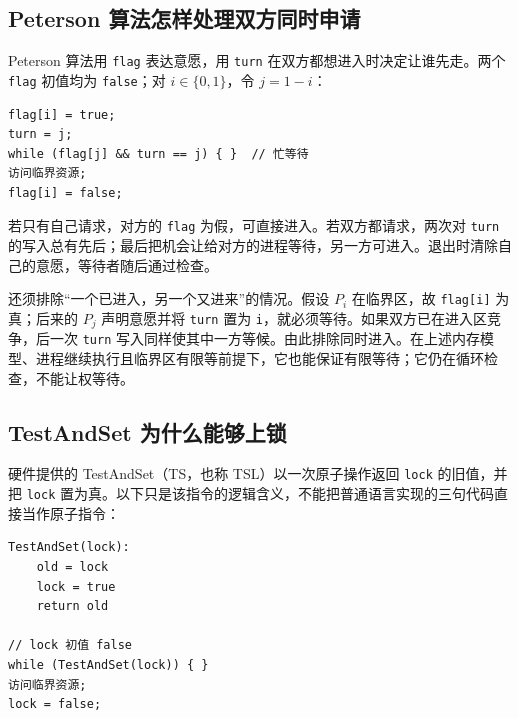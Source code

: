\subsection{Peterson 算法怎样处理双方同时申请}\label{os-c03-h64}

Peterson 算法用 \allowbreak{}\texttt{flag} 表达意愿，用 \allowbreak{}\texttt{turn} 在双方都想进入时决定让谁先走。两个 \allowbreak{}\texttt{flag} 初值均为 \allowbreak{}\texttt{false}；对 \(i\in\{0,1\}\)，令 \(j=1-i\)：

\par\medskip\noindent
\begin{minipage}{\linewidth}
\begin{verbatim}
flag[i] = true;
turn = j;
while (flag[j] && turn == j) { }  // 忙等待
访问临界资源;
flag[i] = false;
\end{verbatim}
\end{minipage}\par\medskip

若只有自己请求，对方的 \allowbreak{}\texttt{flag} 为假，可直接进入。若双方都请求，两次对 \allowbreak{}\texttt{turn} 的写入总有先后；最后把机会让给对方的进程等待，另一方可进入。退出时清除自己的意愿，等待者随后通过检查。

还须排除``一个已进入，另一个又进来''的情况。假设 \(P_i\) 在临界区，故 \allowbreak{}\texttt{flag{[}i{]}} 为真；后来的 \(P_j\) 声明意愿并将 \allowbreak{}\texttt{turn} 置为 \allowbreak{}\texttt{i}，就必须等待。如果双方已在进入区竞争，后一次 \allowbreak{}\texttt{turn} 写入同样使其中一方等候。由此排除同时进入。在上述内存模型、进程继续执行且临界区有限等前提下，它也能保证有限等待；它仍在循环检查，不能让权等待。

\subsection{TestAndSet 为什么能够上锁}\label{os-c03-h80}

硬件提供的 TestAndSet（TS，也称 TSL）以一次原子操作返回 \allowbreak{}\texttt{lock} 的旧值，并把 \allowbreak{}\texttt{lock} 置为真。以下只是该指令的逻辑含义，不能把普通语言实现的三句代码直接当作原子指令：

\par\medskip\noindent
\begin{minipage}{\linewidth}
\begin{verbatim}
TestAndSet(lock):
    old = lock
    lock = true
    return old

// lock 初值 false
while (TestAndSet(lock)) { }
访问临界资源;
lock = false;
\end{verbatim}
\end{minipage}\par\medskip

